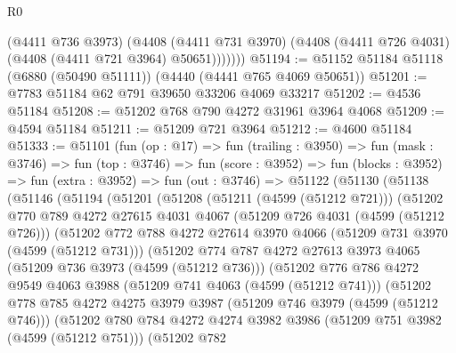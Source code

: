 \begin{lexlean}{R0}
\begin{coremodule}
            (@4411 @736 @3973)
            (@4408
              (@4411 @731 @3970)
              (@4408 (@4411 @726 @4031) (@4408 (@4411 @721 @3964) @50651)))))))
@51194 := @51152 @51184 @51118 (@6880 (@50490 @51111)) (@4440 (@4441 @765 @4069 @50651))
@51201 := @7783 @51184 @62 @791 @39650 @33206 @4069 @33217
@51202 := @4536 @51184
@51208 := @51202 @768 @790 @4272 @31961 @3964 @4068
@51209 := @4594 @51184
@51211 := @51209 @721 @3964
@51212 := @4600 @51184
@51333 := @51101
    (fun (op : @17) =>
    fun (trailing : @3950) =>
    fun (mask : @3746) =>
    fun (top : @3746) =>
    fun (score : @3952) =>
    fun (blocks : @3952) =>
    fun (extra : @3952) =>
    fun (out : @3746) =>
    @51122
      (@51130
        (@51138
          (@51146
            (@51194
              (@51201
                (@51208
                  (@51211 (@4599 (@51212 @721)))
                  (@51202
                    @770
                    @789
                    @4272
                    @27615
                    @4031
                    @4067
                    (@51209 @726 @4031 (@4599 (@51212 @726)))
                    (@51202
                      @772
                      @788
                      @4272
                      @27614
                      @3970
                      @4066
                      (@51209 @731 @3970 (@4599 (@51212 @731)))
                      (@51202
                        @774
                        @787
                        @4272
                        @27613
                        @3973
                        @4065
                        (@51209 @736 @3973 (@4599 (@51212 @736)))
                        (@51202
                          @776
                          @786
                          @4272
                          @9549
                          @4063
                          @3988
                          (@51209 @741 @4063 (@4599 (@51212 @741)))
                          (@51202
                            @778
                            @785
                            @4272
                            @4275
                            @3979
                            @3987
                            (@51209 @746 @3979 (@4599 (@51212 @746)))
                            (@51202
                              @780
                              @784
                              @4272
                              @4274
                              @3982
                              @3986
                              (@51209 @751 @3982 (@4599 (@51212 @751)))
                              (@51202
                                @782

\end{coremodule}
\end{lexlean}
